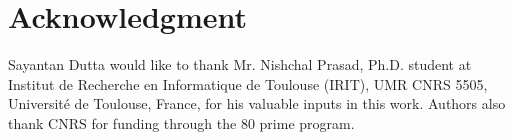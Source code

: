 \documentclass[10pt,journal,compsoc]{IEEEtran}
\begin{document}
\section*{Acknowledgment}
\label{sec:acknowledge}

Sayantan Dutta would like to thank Mr. Nishchal Prasad, Ph.D. student at Institut de Recherche en Informatique de Toulouse (IRIT), UMR CNRS 5505, Universit\'e de Toulouse, France, for his valuable inputs in this work.
Authors also thank CNRS for funding through the 80 prime program.





%









\newpage ~~ \newpage
\end{document}
